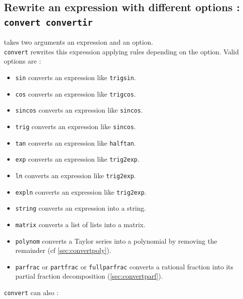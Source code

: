 \documentclass[a4paper,11pt]{book}
\begin{document}
\subsection{Rewrite an expression with different options : {\tt convert convertir}}\label{sec:convert}
 takes two arguments an expression and an option.\\
{\tt convert} rewrites this expression applying rules depending 
on the option. Valid options are :
\begin{itemize}
\item{\tt sin} converts an expression like {\tt trigsin}.
\item{\tt cos} converts an expression like {\tt trigcos}.
\item{\tt sincos} converts an expression like {\tt sincos}.
\item{\tt trig} converts an expression like {\tt sincos}.
\item{\tt tan} converts an expression like {\tt halftan}.
\item{\tt exp} converts an expression like {\tt trig2exp}.
\item{\tt ln} converts an expression like {\tt trig2exp}.
\item{\tt expln} converts an expression like {\tt trig2exp}.
\item{\tt string} converts an expression into a string.
\item{\tt matrix} converts a list of lists into a matrix.
\item{\tt polynom} converts a Taylor series into a polynomial 
by removing the remainder (cf \ref{sec:convertpoly}).
\item{\tt parfrac} or {\tt partfrac} or {\tt fullparfrac} converts a rational 
fraction into its partial fraction decomposition (\ref{sec:convertparf}).
\end{itemize}
{\tt convert} can also :
\end{document}
